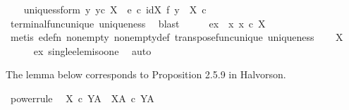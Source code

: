 \begin{isabellebody}
\ \ \isamarkupfalse%
\ uniquess{\isacharunderscore}{\kern0pt}form{\isacharcolon}{\kern0pt}\ {\isachardoublequoteopen}{\isasymforall}y{\isachardot}{\kern0pt}\ {\isacharparenleft}{\kern0pt}y{\isasymin}\isactrlsub c\ {\isasymone}\isactrlbsup X\isactrlesup \ {\isasymlongrightarrow}\ e\ {\isasymcirc}\isactrlsub c\ {\isacharparenleft}{\kern0pt}id{\isacharparenleft}{\kern0pt}X{\isacharparenright}{\kern0pt}\ {\isasymtimes}\isactrlsub f\ y{\isacharparenright}{\kern0pt}\ {\isacharequal}{\kern0pt}\ {\isasymbeta}\isactrlbsub X\ {\isasymtimes}\isactrlsub c\ {\isasymone}\isactrlesub {\isacharparenright}{\kern0pt}{\isachardoublequoteclose}\isanewline
\ \ \ \ \isamarkupfalse%
\ terminal{\isacharunderscore}{\kern0pt}func{\isacharunderscore}{\kern0pt}unique\ uniqueness\ \isamarkupfalse%
\ blast\isanewline
\ \ \isamarkupfalse%
\ \isamarkupfalse%
\ ex{}{\isacharcolon}{\kern0pt}\ {\isachardoublequoteopen}{\isacharparenleft}{\kern0pt}{\isasymexists}{\isacharbang}{\kern0pt}\ x{\isachardot}{\kern0pt}\ x\ {\isasymin}\isactrlsub c\ {\isasymone}\isactrlbsup X\isactrlesup {\isacharparenright}{\kern0pt}{\isachardoublequoteclose}\isanewline
\ \ \ \ \isamarkupfalse%
\ {\isacharparenleft}{\kern0pt}metis\ e{\isacharunderscore}{\kern0pt}defn\ nonempty\ nonempty{\isacharunderscore}{\kern0pt}def\ transpose{\isacharunderscore}{\kern0pt}func{\isacharunderscore}{\kern0pt}unique\ uniqueness{\isacharparenright}{\kern0pt}\isanewline
\ \ \isamarkupfalse%
\ {\isachardoublequoteopen}{\isasymone}\isactrlbsup X\isactrlesup \ {\isasymcong}\ {\isasymone}{\isachardoublequoteclose}\isanewline
\ \ \ \ \isamarkupfalse%
\ ex{}\ single{\isacharunderscore}{\kern0pt}elem{\isacharunderscore}{\kern0pt}iso{\isacharunderscore}{\kern0pt}one\ \isamarkupfalse%
\ auto\isanewline
{}\isamarkupfalse%
%
\endisatagproof
{\isafoldproof}%
%
\isadelimproof
%
\endisadelimproof
%
\begin{isamarkuptext}%
The lemma below corresponds to Proposition 2.5.9 in Halvorson.%
\end{isamarkuptext}\isamarkuptrue%
\isamarkupfalse%
\ power{\isacharunderscore}{\kern0pt}rule{\isacharcolon}{\kern0pt}\isanewline
\ \ {\isachardoublequoteopen}{\isacharparenleft}{\kern0pt}X\ {\isasymtimes}\isactrlsub c\ Y{\isacharparenright}{\kern0pt}\isactrlbsup A\isactrlesup \ {\isasymcong}\ X\isactrlbsup A\isactrlesup \ {\isasymtimes}\isactrlsub c\ Y\isactrlbsup A\isactrlesup {\isachardoublequoteclose}\isanewline

\end{isabellebody}
